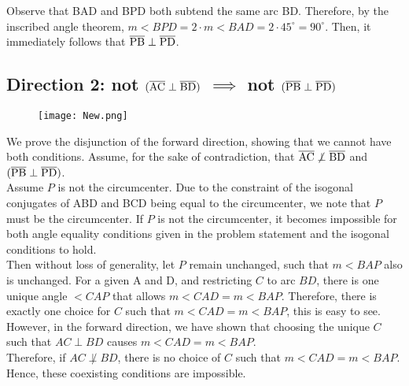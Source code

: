 \documentclass[11pt, letterpaper]{article}
\begin{document}
\begin{solution}{4}
Observe that BAD and BPD both subtend the same arc BD. Therefore, by the inscribed angle theorem, $m<BPD = 2\cdot m<BAD = 2 \cdot 45^{\circ} = 90^{\circ}$. Then, it immediately follows that $\overline{\rm{PB}} \perp \overline{\rm{PD}}$. \qedsymbol
\newpage
\subsection*{Direction 2: not $(\overline{\rm{AC}} \perp \overline{\rm{BD}})$ $\implies$ not $(\overline{\rm{PB}} \perp \overline{\rm{PD}})$}

\begin{figure}
    \centering
    \texttt{[image: New.png]}
\end{figure}

We prove the disjunction of the forward direction, showing that we cannot have both conditions. Assume, for the sake of contradiction, that $\overline{\rm{AC}} \not\perp \overline{\rm{BD}}$ and $(\overline{\rm{PB}} \perp \overline{\rm{PD}})$.  \\


Assume $P$ is not the circumcenter. Due to the constraint of the isogonal conjugates of ABD and BCD being equal to the circumcenter, we note that $P$ must be the circumcenter. If $P$ is not the circumcenter, it becomes impossible for both angle equality conditions given in the problem statement and the isogonal conditions to hold. \\

Then without loss of generality, let $P$ remain unchanged, such that $m<BAP$ also is unchanged. For a given A and D, and restricting $C$ to arc $BD$, there is one unique angle $<CAP$ that allows $m<CAD = m<BAP$. Therefore, there is exactly one choice for $C$ such that $m<CAD = m<BAP$, this is easy to see.\\

However, in the forward direction, we have shown that choosing the unique $C$ such that $AC\perp BD$ causes $m<CAD = m<BAP$. \\ Therefore, if $AC \not \perp BD$, there is no choice of $C$ such that $m<CAD = m<BAP$. Hence, these coexisting conditions are impossible.  \qedsymbol






\end{solution}
\end{document}
